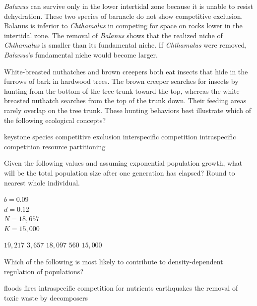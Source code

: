 \begin{choices}
\choice \textit{Balanus} can survive only in the lower intertidal zone because it is unable to resist dehydration.
\choice These two species of barnacle do not show competitive exclusion.
\choice Balanus is inferior to \textit{Chthamalus} in competing for space on rocks lower in the intertidal zone. 
\correctchoice The removal of \textit{Balanus} shows that the realized niche of \textit{Chthamalus} is smaller than its fundamental niche.
\choice If \textit{Chthamalus} were removed, \textit{Balanus}'s fundamental niche would become larger.
\end{choices}

\question
White-breasted nuthatches and brown creepers both eat insects that hide in the furrows of bark in hardwood trees. The brown creeper searches for insects by hunting from the bottom of the tree trunk toward the top, whereas the white-breasted nuthatch searches from the top of the trunk down. Their feeding areas rarely overlap on the tree trunk. These hunting behaviors best illustrate which of the following ecological concepts?

\begin{choices}
\choice keystone species
\choice competitive exclusion
\choice interspecific competition
\choice intraspecific competition
\correctchoice resource partitioning
\end{choices}


\question
Given the following values and assuming exponential population growth, what will be the total population size after one generation has elapsed? Round to nearest whole individual.\vspace{1ex}

\begin{minipage}{1em}
\end{minipage}%
\hspace{2em}%
\begin{minipage}{1.5in}
$b = 0.09$ \\
$d = 0.12$ \\
$N = 18,657$\\
$K = 15,000$\\
\end{minipage}

\begin{choices}
\choice $19,217$
\choice $3,657$
\correctchoice $18,097$
\choice $560$
\choice $15,000$
\end{choices}
\newpage

\question
Which of the following is most likely to contribute to density-dependent regulation of populations?

\begin{choices}
\choice floods
\choice fires
\correctchoice intraspecific competition for nutrients
\choice earthquakes
\choice the removal of toxic waste by decomposers
\end{choices}

